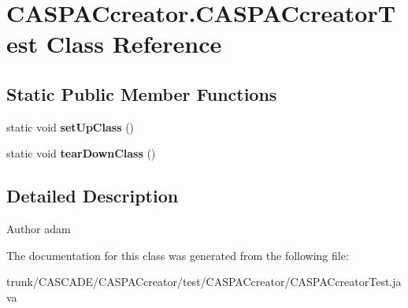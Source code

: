 \hypertarget{class_c_a_s_p_a_ccreator_1_1_c_a_s_p_a_ccreator_test}{\section{C\-A\-S\-P\-A\-Ccreator.\-C\-A\-S\-P\-A\-Ccreator\-Test Class Reference}
\label{class_c_a_s_p_a_ccreator_1_1_c_a_s_p_a_ccreator_test}
}
\subsection*{Static Public Member Functions}
\begin{DoxyCompactItemize}
\item 
\hypertarget{class_c_a_s_p_a_ccreator_1_1_c_a_s_p_a_ccreator_test_a3ab0f82df4a9652e33a691427c2a75e7}{static void {\bfseries set\-Up\-Class} ()}\label{class_c_a_s_p_a_ccreator_1_1_c_a_s_p_a_ccreator_test_a3ab0f82df4a9652e33a691427c2a75e7}

\item 
\hypertarget{class_c_a_s_p_a_ccreator_1_1_c_a_s_p_a_ccreator_test_ac5ba5a6d730573f06968ae443f82fded}{static void {\bfseries tear\-Down\-Class} ()}\label{class_c_a_s_p_a_ccreator_1_1_c_a_s_p_a_ccreator_test_ac5ba5a6d730573f06968ae443f82fded}

\end{DoxyCompactItemize}


\subsection{Detailed Description}
\begin{DoxyAuthor}{Author}
adam 
\end{DoxyAuthor}


The documentation for this class was generated from the following file\-:\begin{DoxyCompactItemize}
\item 
trunk/\-C\-A\-S\-C\-A\-D\-E/\-C\-A\-S\-P\-A\-Ccreator/test/\-C\-A\-S\-P\-A\-Ccreator/C\-A\-S\-P\-A\-Ccreator\-Test.\-java\end{DoxyCompactItemize}
